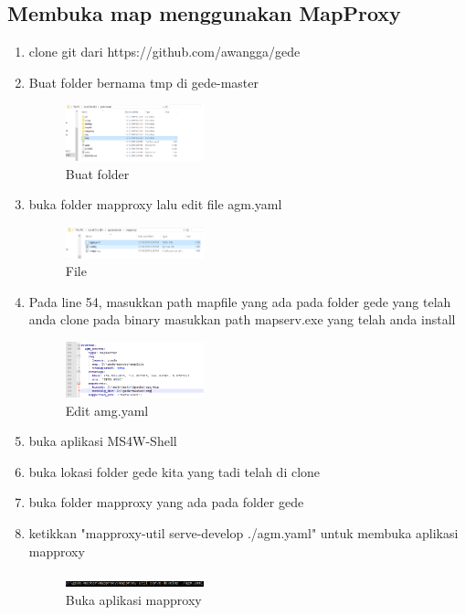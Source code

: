 \subsection{Membuka map menggunakan MapProxy}
\begin{enumerate}
  \item clone git dari https://github.com/awangga/gede
  \item Buat folder bernama tmp di gede-master
  \hfill\break
  \begin{figure}[H]
  \includegraphics[width=4cm]{figures/tugas4/1174091/8.png}
  \centering
  \caption{Buat folder}
  \end{figure}

  \item buka folder mapproxy lalu edit file agm.yaml
  \hfill\break
  \begin{figure}[H]
  \includegraphics[width=4cm]{figures/tugas4/1174091/9.png}
  \centering
  \caption{File}
  \end{figure}

  \item Pada line 54, masukkan path mapfile yang ada pada folder gede yang telah anda clone pada binary masukkan path mapserv.exe yang telah anda install
  \hfill\break
  \begin{figure}[H]
  \includegraphics[width=4cm]{figures/tugas4/1174091/10.png}
  \centering
  \caption{Edit amg.yaml}
  \end{figure}




  \item buka aplikasi MS4W-Shell
  

  \item buka lokasi folder gede kita yang tadi telah di clone
  

  \item buka folder mapproxy yang ada pada folder gede


  \item ketikkan "mapproxy-util serve-develop ./agm.yaml" untuk membuka aplikasi mapproxy
  \hfill\break
  \begin{figure}[H]
  \includegraphics[width=4cm]{figures/tugas4/1174091/11.png}
  \centering
  \caption{Buka aplikasi mapproxy}
  \end{figure}
  

\end{enumerate}
